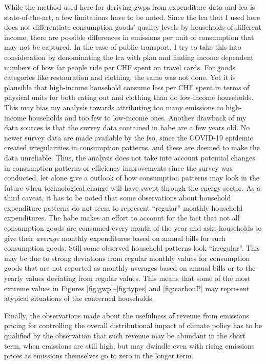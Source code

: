 \documentclass[referee, lineno, pdflatex,sn-apa]{sn-jnl}%
\theoremstyle{thmstyleone}%
\theoremstyle{thmstyletwo}%
\theoremstyle{thmstylethree}%
\begin{document}
While the method used here for deriving \acp{gwp} from expenditure data and \ac{lca} is state-of-the-art, a few limitations have to be noted.
Since the \ac{lca} that I used here does not differentiate consumption goods' quality levels by households of different income, there are possible differences in emissions per unit of consumption that may not be captured.
In the case of public transport, I try to take this into consideration by denominating the \ac{lca} with \ac{pkm} and finding income dependent numbers of how far people ride per CHF spent on travel cards.
For goods categories like restauration and clothing, the same was not done.
Yet it is plausible that high-income household consume less per CHF spent in terms of physical units for both eating out and clothing than do low-income households.
This may bias my analysis towards attributing too many emissions to high-income households and too few to low-income ones.
Another drawback of my data sources is that the survey data contained in \ac{habe} are a few years old.
No newer survey data are made available by the \ac{fso}, since the COVID-19 epidemic created irregularities in consumption patterns, and these are deemed to make the data unreliable.
Thus, the analysis does not take into account potential changes in consumption patterns or efficiency improvements since the survey was conducted, let alone give a outlook of how consumption patterns may look in the future when technological change will have swept through the energy sector.
As a third caveat, it has to be noted that some observations about household expenditure patterns do not seem to represent ``regular'' monthly household expenditures.
The \ac{habe} makes an effort to account for the fact that not all consumption goods are consumed every month of the year and asks households to give their \emph{average} monthly expenditures based on annual bills for such consumption goods.
Still some observed household patterns look ``irregular''.
This may be due to strong deviations from regular monthly values for consumption goods that are not reported as monthly averages based on annual bills or to  the yearly values deviating from regular values.
This means that some of the most extreme values in Figures \ref{fig:gwp}--\ref{fig:types} and \ref{fig:carbonP} may represent atypical situations of the concerned households.

Finally, the observations made about the usefulness of revenue from emissions pricing for controlling the overall distributional impact of climate policy has to be qualified by the observation that such revenue may be abundant in the short term, when emissions are still high, but may dwindle even with rising emissions prices as emissions themselves go to zero in the longer term.
\end{document}
